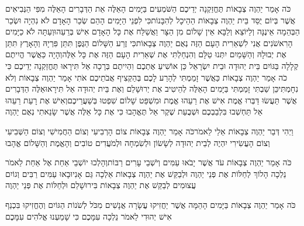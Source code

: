 \documentclass[../main/main.tex]{subfiles}
\begin{document}
\begin{multicols*}{\ncols}
כֹּה אָמַר יַהְוֶה צְבָאוֹת תֶּחֱזַקְנָה יְדֵיכֶם הַשֹּׁמְעִים בַּיָּמִים הָאֵלֶּה אֵת הַדְּבָרִים הָאֵלֶּה מִפִּי הַנְּבִיאִים אֲשֶׁר בְּיוֹם יֻסַּד בֵּית יַהְוֶה צְבָאוֹת הַהֵיכָל לְהִבָּנוֹת\PreVerseSpace{}כִּי לִפְנֵי הַיָּמִים הָהֵם שְׂכַר הָאָדָם לֹא נִהְיָה וּשְׂכַר הַבְּהֵמָה אֵינֶנָּה וְלַיּוֹצֵא וְלַבָּא אֵין שָׁלוֹם מִן הַצָּר וַאֲשַׁלַּח אֶת כָּל הָאָדָם אִישׁ בְּרֵעֵהוּ\PreVerseSpace{}וְעַתָּה לֹא כַיָּמִים הָרִאשֹׁנִים אֲנִי לִשְׁאֵרִית הָעָם הַזֶּה נְאֻם יַהְוֶה צְבָאוֹת\PreVerseSpace{}כִּי זֶרַע הַשָּׁלוֹם הַגֶּפֶן תִּתֵּן פִּרְיָהּ וְהָאָרֶץ תִּתֵּן אֶת יְבוּלָהּ וְהַשָּׁמַיִם יִתְּנוּ טַלָּם וְהִנְחַלְתִּי אֶת שְׁאֵרִית הָעָם הַזֶּה אֶת כָּל אֵלֶּה\PreVerseSpace{}וְהָיָה כַּאֲשֶׁר הֱיִיתֶם קְלָלָה בַּגּוֹיִם בֵּית יְהוּדָה וּבֵית יִשְׂרָאֵל כֵּן אוֹשִׁיעַ אֶתְכֶם וִהְיִיתֶם בְּרָכָה אַל תִּירָאוּ תֶּחֱזַקְנָה יְדֵיכֶם \ClosedSection{}כִּי כֹה אָמַר יַהְוֶה צְבָאוֹת כַּאֲשֶׁר זָמַמְתִּי לְהָרַע לָכֶם בְּהַקְצִיף אֲבֹתֵיכֶם אֹתִי אָמַר יַהְוֶה צְבָאוֹת וְלֹא נִחָמְתִּי\PreVerseSpace{}כֵּן שַׁבְתִּי זָמַמְתִּי בַּיָּמִים הָאֵלֶּה לְהֵיטִיב אֶת יְרוּשָׁלֵם וְאֶת בֵּית יְהוּדָה אַל תִּירָאוּ\PreVerseSpace{}אֵלֶּה הַדְּבָרִים אֲשֶׁר תַּעֲשׂוּ דַּבְּרוּ אֱמֶת אִישׁ אֶת רֵעֵהוּ אֱמֶת וּמִשְׁפַּט שָׁלוֹם שִׁפְטוּ בְּשַׁעֲרֵיכֶם\PreVerseSpace{}וְאִישׁ אֶת רָעַת רֵעֵהוּ אַל תַּחְשְׁבוּ בִּלְבַבְכֶם וּשְׁבֻעַת שֶׁקֶר אַל תֶּאֱהָבוּ כִּי אֶת כָּל אֵלֶּה אֲשֶׁר שָׂנֵאתִי נְאֻם יַהְוֶה\OpenSection{}\par
{}וַיְהִי דְּבַר יַהְוֶה צְבָאוֹת אֵלַי לֵאמֹר\PreVerseSpace{}כֹּה אָמַר יַהְוֶה צְבָאוֹת צוֹם הָרְבִיעִי וְצוֹם הַחֲמִישִׁי וְצוֹם הַשְּׁבִיעִי וְצוֹם הָעֲשִׂירִי יִהְיֶה לְבֵית יְהוּדָה לְשָׂשׂוֹן וּלְשִׂמְחָה וּלְמֹעֲדִים טוֹבִים וְהָאֱמֶת וְהַשָּׁלוֹם אֱהָבוּ\OpenSection{}\par
{}כֹּה אָמַר יַהְוֶה צְבָאוֹת עֹד אֲשֶׁר יָבֹאוּ עַמִּים וְיֹשְׁבֵי עָרִים רַבּוֹת\PreVerseSpace{}וְהָלְכוּ יוֹשְׁבֵי אַחַת אֶל אַחַת לֵאמֹר נֵלְכָה הָלוֹךְ לְחַלּוֹת אֶת פְּנֵי יַהְוֶה וּלְבַקֵּשׁ אֶת יַהְוֶה צְבָאוֹת אֵלְכָה גַּם אָנִי\PreVerseSpace{}וּבָאוּ עַמִּים רַבִּים וְגוֹיִם עֲצוּמִים לְבַקֵּשׁ אֶת יַהְוֶה צְבָאוֹת בִּירוּשָׁלֵם וּלְחַלּוֹת אֶת פְּנֵי יַהְוֶה\OpenSection{}\par
{}כֹּה אָמַר יַהְוֶה צְבָאוֹת בַּיָּמִים הָהֵמָּה אֲשֶׁר יַחֲזִיקוּ עֲשָׂרָה אֲנָשִׁים מִכֹּל לְשֹׁנוֹת הַגּוֹיִם וְהֶחֱזִיקוּ בִּכְנַף אִישׁ יְהוּדִי לֵאמֹר נֵלְכָה עִמָּכֶם כִּי שָׁמַעְנוּ אֱלֹהִים עִמָּכֶם\OpenSection{}\par

\end{multicols*}
\end{document}
